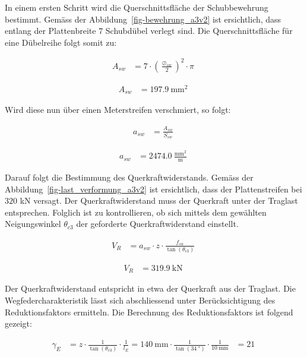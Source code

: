 \documentclass[
  11pt,
  letterpaper,
]{scrreprt}
\begin{document}
In einem ersten Schritt wird die Querschnittsfläche der Schubbewehrung
bestimmt. Gemäss der Abbildung~\ref{fig-bewehrung_a3v2} ist ersichtlich,
dass entlang der Plattenbreite \(7\) Schubdübel verlegt sind. Die
Querschnittsfläche für eine Dübelreihe folgt somit zu:

$$
\begin{aligned}
A_{sw} &= 7 \cdot \left( \frac{ \oslash_{sw} }{ 2 } \right) ^{ 2 } \cdot \pi \; 
\end{aligned}
$$

$$
\begin{aligned}
A_{sw} &= 197.9\ \mathrm{mm}^{2} \;
\end{aligned}
$$

Wird diese nun über einen Meterstreifen verschmiert, so folgt:

$$
\begin{aligned}
a_{sw} &= \frac{ A_{sw} }{ S_{sw} } \; 
\end{aligned}
$$

$$
\begin{aligned}
a_{sw} &= 2474.0\ \frac{\mathrm{mm}^{2}}{\mathrm{m}} \;
\end{aligned}
$$

Darauf folgt die Bestimmung des Querkraftwiderstands. Gemäss der
Abbildung~\ref{fig-last_verformung_a3v2} ist ersichtlich, dass der
Plattenstreifen bei \(320\) kN versagt. Der Querkraftwiderstand muss der
Querkraft unter der Traglast entsprechen. Folglich ist zu kontrollieren,
ob sich mittels dem gewählten Neigungswinkel \(\theta_{c3}\) der
geforderte Querkraftwiderstand einstellt.

$$
\begin{aligned}
V_{R} &= a_{sw} \cdot z \cdot \frac{ f_{su} }{ \tan \left( \theta_{c3} \right) } \; 
\end{aligned}
$$

$$
\begin{aligned}
V_{R} &= 319.9\ \mathrm{kN} \;
\end{aligned}
$$

Der Querkraftwiderstand entspricht in etwa der Querkraft aus der
Traglast. Die Wegfedercharakteristik lässt sich abschliessend unter
Berücksichtigung des Reduktionsfaktors ermitteln. Die Berechnung des
Reduktionsfaktors ist folgend gezeigt:

$$
\begin{aligned}
\gamma_{E} &= z \cdot \frac{ 1 }{ \tan \left( \theta_{c3} \right) } \cdot \frac{1} { l_{E} }  = 140\ \mathrm{mm} \cdot \frac{ 1 }{ \tan \left( 34\ \mathrm{°} \right) } \cdot \frac{1} { 10\ \mathrm{mm} } &= 21\  
\end{aligned}
$$
\end{document}
